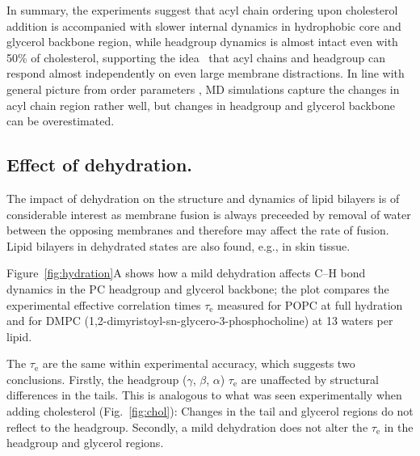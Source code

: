 \documentclass[journal=jcisd8,manuscript=article,layout=twocolumn]{achemso}
\begin{document}


In summary, the experiments suggest that acyl chain ordering upon cholesterol addition is accompanied
with slower internal dynamics in hydrophobic core and glycerol backbone region, while headgroup dynamics is almost
intact even with 50\% of cholesterol, supporting the idea~\cite{Antila:2020a} that acyl chains and headgroup can respond
almost independently on even large membrane distractions.
In line with general picture from order parameters \cite{Ollila:2016a}, MD simulations capture the changes
in acyl chain region rather well, but changes in headgroup and glycerol backbone can be overestimated.

\subsection*{Effect of dehydration.}
The impact of dehydration on the structure and dynamics of lipid bilayers is of considerable interest as  membrane fusion is always preceeded by removal of water between the opposing membranes and therefore may affect the rate of fusion. Lipid bilayers in dehydrated states are also found, e.g., in skin tissue. 

Figure~\ref{fig:hydration}A shows how a mild dehydration affects
C--H bond dynamics in the PC headgroup and glycerol backbone;
the plot compares the experimental effective correlation times $\tau_\mathrm e$
measured for POPC at full hydration and for DMPC (1,2-dimyristoyl-sn-glycero-3-phosphocholine)
at 13 waters per lipid.


The $\tau_\mathrm e$ are the same within experimental accuracy, which suggests two conclusions. Firstly, 
the headgroup ($\gamma$, $\beta$, $\alpha$) $\tau_\mathrm e$ are unaffected by structural differences in the tails. This is analogous to  what was seen experimentally when adding cholesterol
(Fig.~\ref{fig:chol}): Changes in the tail and glycerol regions do not reflect to the headgroup. Secondly, a mild dehydration does not alter the $\tau_\mathrm e$
in the headgroup and glycerol regions. 
\end{document}
